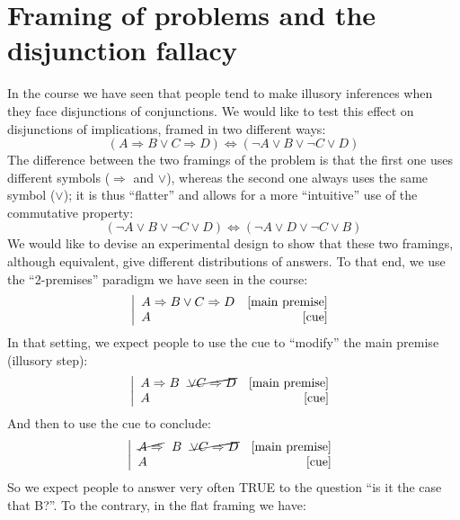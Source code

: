\documentclass[]{article}
\begin{document}
\section{Framing of problems and the disjunction fallacy}
In the course we have seen that people tend to make illusory inferences when they face disjunctions of conjunctions. We would like to test this effect on disjunctions of implications, framed in two different ways:
\begin{equation}
(A \Rightarrow B \vee C \Rightarrow D) \iff (\neg A \vee B \vee \neg C \vee D)
\end{equation}
The difference between the two framings of the problem is that the first one uses different symbols ($\Rightarrow$ and $\vee$), whereas the second one always uses the same symbol ($\vee$); it is thus ``flatter'' and allows for a more ``intuitive'' use of the commutative property:
\begin{equation}
(\neg A \vee B \vee \neg C \vee D) \iff (\neg A \vee D \vee \neg C \vee B)
\end{equation}
We would like to devise an experimental design to show that these two framings, although equivalent, give different distributions of answers. To that end, we use the ``2-premises'' paradigm we have seen in the course:
\begin{equation}\left | 
\begin{array}{l r}
A \Rightarrow B \vee C \Rightarrow D & \mbox{[main premise]} \\
A & \mbox{[cue]}
\end{array} \right .
\end{equation}
In that setting, we expect people to use the cue to ``modify'' the main premise (illusory step):
\begin{equation}\left |
\begin{array}{l r}
A \Rightarrow B \ \ \cancel{\vee C \Rightarrow D} & \mbox{[main premise]} \\
A & \mbox{[cue]}
\end{array} \right .
\end{equation}
And then to use the cue to conclude:
\begin{equation} \left |
\begin{array}{lr}
\cancel{A \Rightarrow} \ \ B \ \ \cancel{\vee C \Rightarrow D} & \mbox{[main premise]} \\
A & \mbox{[cue]}
\end{array} \right .
\end{equation}
So we expect people to answer very often TRUE to the question ``is it the case that B?''. To the contrary, in the flat framing we have:
\end{document}
